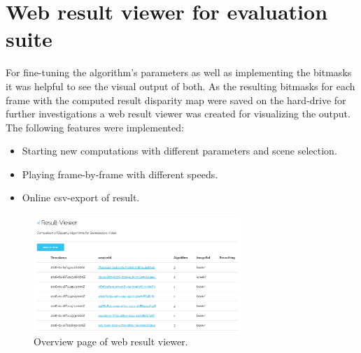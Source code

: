 \section{Web result viewer for evaluation suite}

For fine-tuning the algorithm's parameters as well as implementing the bitmasks it was helpful to see the visual output of both.
As the resulting bitmasks for each frame with the computed result disparity map were saved on the hard-drive for further investigations a web result viewer was created for visualizing the output.
The following features were implemented:
\begin{itemize}
  \item Starting new computations with different parameters and scene selection.
  \item Playing frame-by-frame with different speeds.
  \item Online csv-export of result.
\end{itemize}

\begin{figure}[p!]
  \centering
  \includegraphics[angle=90,width=0.7\textwidth]{src/images/result-viewer-overview.png}
  \caption{Overview page of web result viewer.}
  \label{fig:web-overview}
\end{figure}

